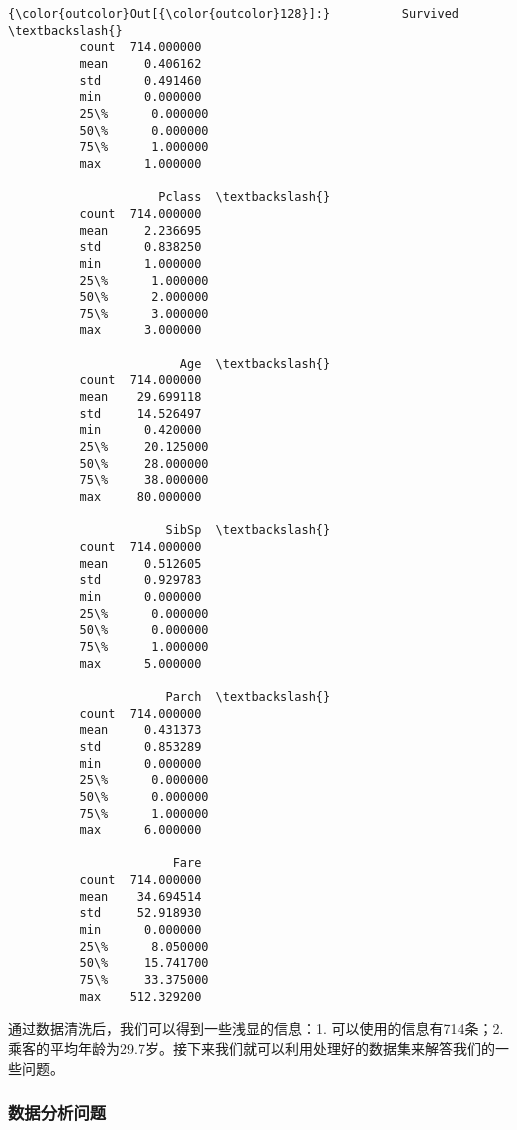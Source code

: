 \documentclass[11pt]{article}
\begin{document}
\begin{Verbatim}[commandchars=\\\{\}]
{\color{outcolor}Out[{\color{outcolor}128}]:}          Survived  \textbackslash{}
          count  714.000000   
          mean     0.406162   
          std      0.491460   
          min      0.000000   
          25\%      0.000000   
          50\%      0.000000   
          75\%      1.000000   
          max      1.000000   
          
                     Pclass  \textbackslash{}
          count  714.000000   
          mean     2.236695   
          std      0.838250   
          min      1.000000   
          25\%      1.000000   
          50\%      2.000000   
          75\%      3.000000   
          max      3.000000   
          
                        Age  \textbackslash{}
          count  714.000000   
          mean    29.699118   
          std     14.526497   
          min      0.420000   
          25\%     20.125000   
          50\%     28.000000   
          75\%     38.000000   
          max     80.000000   
          
                      SibSp  \textbackslash{}
          count  714.000000   
          mean     0.512605   
          std      0.929783   
          min      0.000000   
          25\%      0.000000   
          50\%      0.000000   
          75\%      1.000000   
          max      5.000000   
          
                      Parch  \textbackslash{}
          count  714.000000   
          mean     0.431373   
          std      0.853289   
          min      0.000000   
          25\%      0.000000   
          50\%      0.000000   
          75\%      1.000000   
          max      6.000000   
          
                       Fare  
          count  714.000000  
          mean    34.694514  
          std     52.918930  
          min      0.000000  
          25\%      8.050000  
          50\%     15.741700  
          75\%     33.375000  
          max    512.329200  
\end{Verbatim}
            
    通过数据清洗后，我们可以得到一些浅显的信息：1. 可以使用的信息有714条；2.
乘客的平均年龄为29.7岁。接下来我们就可以利用处理好的数据集来解答我们的一些问题。

    \subsubsection{数据分析问题}\label{ux6570ux636eux5206ux6790ux95eeux9898}
\end{document}
